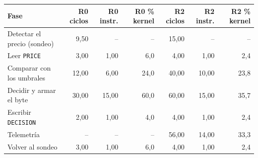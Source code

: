 \begin{tabular}{lrrrrrr}
\toprule
Fase & R0 ciclos & R0 instr. & R0 \% kernel & R2 ciclos & R2 instr. & R2 \% kernel \\
\midrule
Detectar el precio (sondeo) & 9{,}50 & -- & -- & 15{,}00 & -- & -- \\
Leer \texttt{PRICE} & 3{,}00 & 1{,}00 & 6{,}0 & 4{,}00 & 1{,}00 & 2{,}4 \\
Comparar con los umbrales & 12{,}00 & 6{,}00 & 24{,}0 & 40{,}00 & 10{,}00 & 23{,}8 \\
Decidir y armar el byte & 30{,}00 & 15{,}00 & 60{,}0 & 60{,}00 & 15{,}00 & 35{,}7 \\
Escribir \texttt{DECISION} & 2{,}00 & 1{,}00 & 4{,}0 & 4{,}00 & 1{,}00 & 2{,}4 \\
Telemetría & -- & -- & -- & 56{,}00 & 14{,}00 & 33{,}3 \\
Volver al sondeo & 3{,}00 & 1{,}00 & 6{,}0 & 4{,}00 & 1{,}00 & 2{,}4 \\
\bottomrule
\end{tabular}
\par{}
